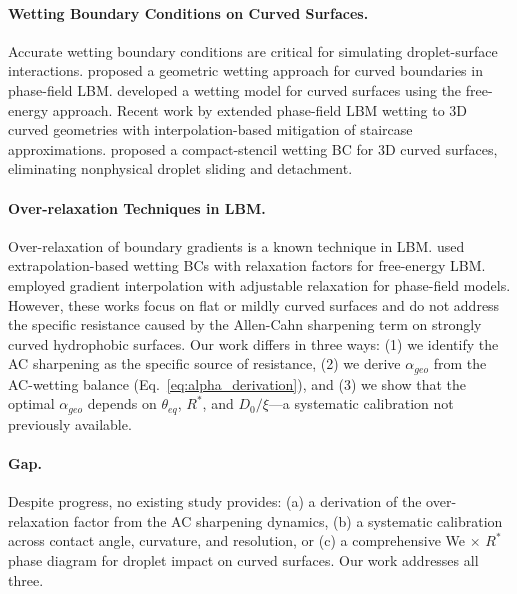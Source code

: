 \paragraph{Wetting Boundary Conditions on Curved Surfaces.}
Accurate wetting boundary conditions are critical for simulating droplet-surface interactions. \citet{fakhari2017diffuse} proposed a geometric wetting approach for curved boundaries in phase-field LBM. \citet{connington2015lattice} developed a wetting model for curved surfaces using the free-energy approach. Recent work by \citet{sashko2024phase} extended phase-field LBM wetting to 3D curved geometries with interpolation-based mitigation of staircase approximations. \citet{compact2025stencil} proposed a compact-stencil wetting BC for 3D curved surfaces, eliminating nonphysical droplet sliding and detachment.

\paragraph{Over-relaxation Techniques in LBM.}
Over-relaxation of boundary gradients is a known technique in LBM. \citet{ding2007lattice} used extrapolation-based wetting BCs with relaxation factors for free-energy LBM. \citet{zheng2020lattice} employed gradient interpolation with adjustable relaxation for phase-field models. However, these works focus on flat or mildly curved surfaces and do not address the specific resistance caused by the Allen-Cahn sharpening term on strongly curved hydrophobic surfaces. Our work differs in three ways: (1) we identify the AC sharpening as the specific source of resistance, (2) we derive $\alpha_{geo}$ from the AC-wetting balance (Eq.~\ref{eq:alpha_derivation}), and (3) we show that the optimal $\alpha_{geo}$ depends on $\theta_{eq}$, $R^*$, and $D_0/\xi$---a systematic calibration not previously available.

\paragraph{Gap.}
Despite progress, no existing study provides: (a) a derivation of the over-relaxation factor from the AC sharpening dynamics, (b) a systematic calibration across contact angle, curvature, and resolution, or (c) a comprehensive We $\times$ $R^*$ phase diagram for droplet impact on curved surfaces. Our work addresses all three.
